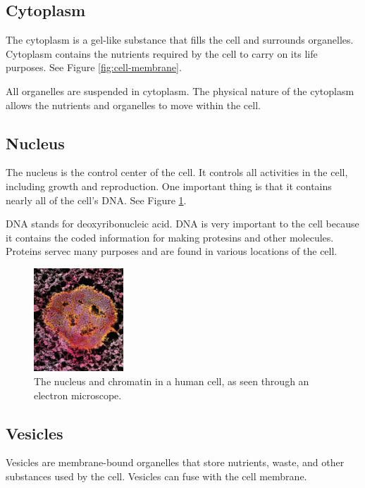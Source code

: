 \documentclass[12pt]{report}
\begin{document}
\subsection{Cytoplasm}
\begin{definition}[Cytoplasm]
    The cytoplasm is a gel-like substance that fills the cell and surrounds organelles. Cytoplasm contains the nutrients required by the cell to carry on its life purposes. See Figure \ref{fig:cell-membrane}. 
\end{definition}

All organelles are suspended in cytoplasm. The physical nature of the cytoplasm allows the nutrients and organelles to move within the cell.

\subsection{Nucleus}
\begin{definition}[Nucleus]
    The nucleus is the control center of the cell. It controls all activities in the cell, including growth and reproduction. One important thing is that it contains nearly all of the cell's DNA. See Figure \ref{fig:nucleus}.
\end{definition}

\begin{note}{ }
    DNA stands for deoxyribonucleic acid. DNA is very important to the cell because it contains the coded information for making protesins and other molecules. Proteins servec many purposes and are found in various locations of the cell.
\end{note}

\begin{figure}[H]
\centering
    \includegraphics[width=0.3\textwidth]{../figures/nucleus.png}
    \caption{The nucleus and chromatin in a human cell, as seen through an electron microscope.}
    \label{fig:nucleus}
\end{figure}

\subsection{Vesicles}
\begin{definition}[Vesicles]
    Vesicles are membrane-bound organelles that store nutrients, waste, and other substances used by the cell. Vesicles can fuse with the cell membrane. 
\end{definition}
\end{document}
